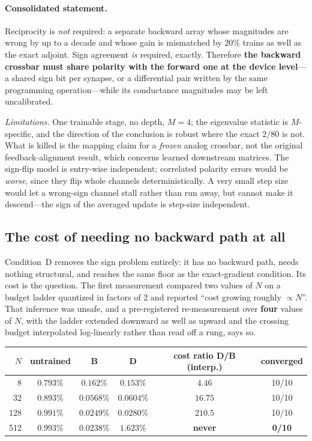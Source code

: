\documentclass[11pt]{article}
\begin{document}
\paragraph{Consolidated statement.} Reciprocity is \textit{not} required: a separate backward array whose magnitudes are wrong by up to a decade and whose gain is mismatched by $20\%$ trains as well as the exact adjoint. Sign agreement \textit{is} required, exactly. Therefore \textbf{the backward crossbar must share polarity with the forward one at the device level}---a shared sign bit per synapse, or a differential pair written by the same programming operation---while its conductance magnitudes may be left uncalibrated.

\textit{Limitations.} One trainable stage, no depth, $M = 4$; the eigenvalue statistic is $M$-specific, and the direction of the conclusion is robust where the exact $2/80$ is not. What is killed is the mapping claim for a \textit{frozen} analog crossbar, not the original feedback-alignment result, which concerns learned downstream matrices. The sign-flip model is entry-wise independent; correlated polarity errors would be \textit{worse}, since they flip whole channels deterministically. A very small step size would let a wrong-sign channel stall rather than run away, but cannot make it descend---the sign of the averaged update is step-size independent.

\subsection{The cost of needing no backward path at all}
\label{sec:pertcost}

Condition~D removes the sign problem entirely: it has no backward path, needs nothing structural, and reaches the same floor as the exact-gradient condition. Its cost is the question. The first measurement compared two values of $N$ on a budget ladder quantized in factors of 2 and reported ``cost growing roughly $\propto N$''. That inference was unsafe, and a pre-registered re-measurement over \textbf{four} values of $N$, with the ladder extended downward as well as upward and the crossing budget interpolated log-linearly rather than read off a rung, says so.

\begin{center}
\footnotesize
\begin{tabular}{rccccc}
\toprule
$N$ & untrained & B & D & cost ratio D/B (interp.) & converged \\
\midrule
8 & $0.793\%$ & $0.162\%$ & $0.153\%$ & $\mathbf{4.46}$ & 10/10 \\
32 & $0.893\%$ & $0.0568\%$ & $0.0604\%$ & $16.75$ & 10/10 \\
128 & $0.991\%$ & $0.0249\%$ & $0.0280\%$ & $210.5$ & 10/10 \\
512 & $0.993\%$ & $0.0238\%$ & $1.623\%$ & \textbf{never} & \textbf{0/10} \\
\bottomrule
\end{tabular}
\end{center}
\end{document}
